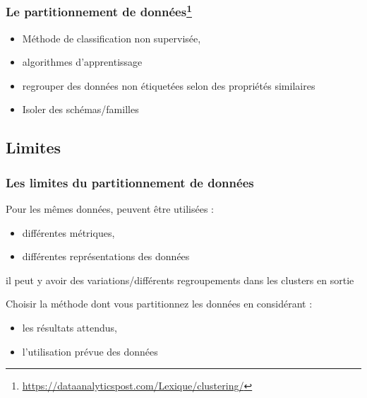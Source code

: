 \begin{frame}
  \frametitle{Le partitionnement de données\footnote{\url{https://dataanalyticspost.com/Lexique/clustering/}}}


 \begin{itemize}
  \item {} Méthode de classification non supervisée, 
  \item {} algorithmes d’apprentissage 
  \item {} regrouper des données non étiquetées selon des propriétés similaires
  \item {} Isoler des schémas/familles
  
  
 \end{itemize}
 


\end{frame}
\subsection{Limites}
\begin{frame}
  \frametitle{Les limites du partitionnement de données}

 Pour les mêmes données, peuvent être utilisées :

\begin{itemize}
  \item {} différentes métriques,
  \item {} différentes représentations des données 
 \end{itemize}

 il peut y avoir des variations/différents regroupements dans les clusters en sortie   

 Choisir la méthode dont vous partitionnez les données en considérant :

 \begin{itemize}
  \item {} les résultats attendus,
  \item {} l’utilisation prévue des données
 \end{itemize}
\end{frame}

